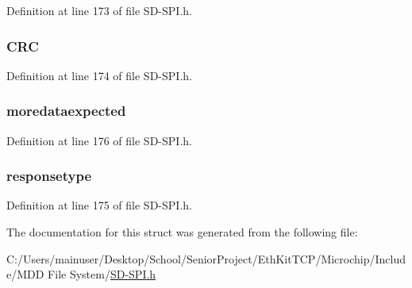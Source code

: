 Definition at line 173 of file S\+D-\/\+S\+P\+I.\+h.

\hypertarget{structtyp_m_m_c___c_m_d_a6fec08b802532658479eb321c4e3aaa0}{}
\subsubsection[{C\+R\+C}]{ C\+R\+C}\label{structtyp_m_m_c___c_m_d_a6fec08b802532658479eb321c4e3aaa0}


Definition at line 174 of file S\+D-\/\+S\+P\+I.\+h.

\hypertarget{structtyp_m_m_c___c_m_d_ae3b3fb112797077e7a5dc6d7802a0f46}{}
\subsubsection[{moredataexpected}]{ moredataexpected}\label{structtyp_m_m_c___c_m_d_ae3b3fb112797077e7a5dc6d7802a0f46}


Definition at line 176 of file S\+D-\/\+S\+P\+I.\+h.

\hypertarget{structtyp_m_m_c___c_m_d_ad3dbb1af1d33fef7cbfdf40aa12e625c}{}
\subsubsection[{responsetype}]{ responsetype}\label{structtyp_m_m_c___c_m_d_ad3dbb1af1d33fef7cbfdf40aa12e625c}


Definition at line 175 of file S\+D-\/\+S\+P\+I.\+h.



The documentation for this struct was generated from the following file\+:\begin{DoxyCompactItemize}
\item 
C\+:/\+Users/mainuser/\+Desktop/\+School/\+Senior\+Project/\+Eth\+Kit\+T\+C\+P/\+Microchip/\+Include/\+M\+D\+D File System/\hyperlink{_s_d-_s_p_i_8h}{S\+D-\/\+S\+P\+I.\+h}\end{DoxyCompactItemize}
